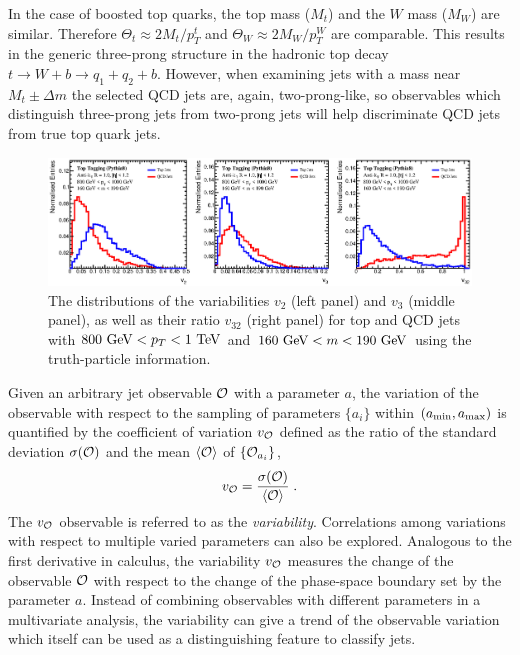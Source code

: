 \documentclass[aps,prl,floatfix,preprintnumbers,twocolumn,groupedaddress,nofootinbib]{revtex4-1}
\newcommand{\be}{\begin{equation}}
\newcommand{\ee}{\end{equation}}
\begin{document}
In the case of boosted top quarks, the top mass ($M_t$) and the $W$ mass ($M_W$) are similar. Therefore $\Theta_t \approx 2M_t/p_T^t$ and $\Theta_W \approx 2M_W/p_T^W$ are comparable. This results in the generic three-prong structure in the hadronic top decay $t\rightarrow W+b \rightarrow q_1+q_2+b$. However, when examining jets with a mass near $M_t\pm \Delta m$ the selected QCD jets are, again, two-prong-like, so observables which distinguish three-prong jets from two-prong jets will help discriminate QCD jets from true top quark jets.

\begin{figure}
    \includegraphics[width=2\columnwidth]{plots/Top_vs_high.eps}
    \caption{The distributions of the variabilities $v_2$ (left panel) and $v_3$ (middle panel), as well as their ratio $v_{32}$ (right panel) for top and QCD jets with $800~{\rm GeV} < p_T < 1~{\rm TeV}$ and $160~{\rm GeV} < m < 190~{\rm GeV}$ using the truth-particle information.}
\label{v42}
\end{figure}

Given an arbitrary jet observable $\cal O$ with a parameter $a$,
the variation of the observable with respect to the sampling of parameters $\{a_i\}$ within $(a_{\rm min},a_{\rm max})$ is quantified by the coefficient of variation $v_{\cal O}$ defined as the ratio of the standard deviation $\sigma({\cal O})$ and the mean $\langle {\cal O}\rangle$ of $\{{\cal O}_{a_i}\}$,
\be
    v_{\cal O} = \frac{\sigma({\cal O})}{\langle {\cal O}\rangle}\;.
\ee
The $v_{\cal O}$ observable is referred to as the {\sl variability}. Correlations among variations with respect to multiple varied parameters can also be explored. Analogous to the first derivative in calculus, the variability $v_{\cal O}$ measures the change of the observable $\cal O$ with respect to the change of the phase-space boundary set by the parameter $a$. Instead of combining observables with different parameters in a multivariate analysis, the variability can give a trend of the observable variation which itself can be used as a distinguishing feature to classify jets.
\end{document}
